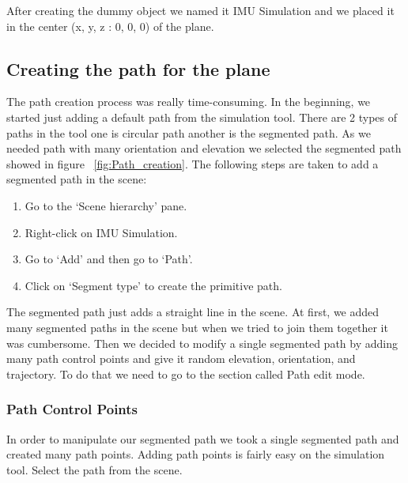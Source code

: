 After creating the dummy object we named it IMU Simulation  and we placed it in the center  (x, y, z : 0, 0, 0)  of the plane.


\subsection{Creating the path for the plane}

The path creation process was really time-consuming. In the beginning, we started just adding a default path from the simulation tool. There are 2 types of paths in the tool one is circular path another is the segmented path. As we needed path with many orientation and elevation we selected the segmented path showed in figure ~\ref{fig:Path_creation}.
The following steps are taken to add a segmented path in the scene:

\begin{enumerate}
  \item Go to the ‘Scene hierarchy’ pane.
  \item Right-click on IMU Simulation.
  \item Go to ‘Add’ and then go to ‘Path’.
  \item Click on ‘Segment type’ to create the primitive path.
\end{enumerate}

The segmented path just adds a straight line in the scene. At first, we added many segmented paths in the scene but when we tried to join them together it was cumbersome.
Then we decided to modify a single segmented path by adding many path control points and give it random elevation, orientation, and trajectory. To do that we need to go to the section called Path edit mode.

\subsubsection{Path Control Points}


In order to manipulate our segmented path we took a single segmented path and created many path points. Adding path points is fairly easy on the simulation tool.
Select the path from the scene.

